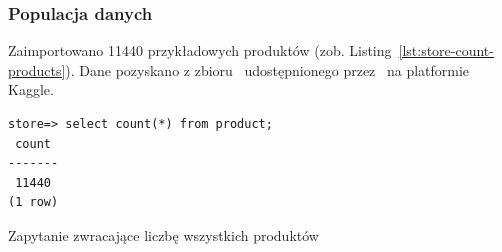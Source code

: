 \subsubsection{Populacja danych}

Zaimportowano 11440 przykładowych produktów (zob. Listing~\ref{lst:store-count-products}).
Dane pozyskano z zbioru~\cite{fashion-dataset} udostępnionego przez~\citeauthor*{fashion-dataset} na platformie Kaggle.

\begin{listing}[H]
    \begin{verbatim}
store=> select count(*) from product;
 count
-------
 11440
(1 row)
    \end{verbatim}
    \caption{Zapytanie zwracające liczbę wszystkich produktów}
    \label{lst:store-count-products}
\end{listing}
